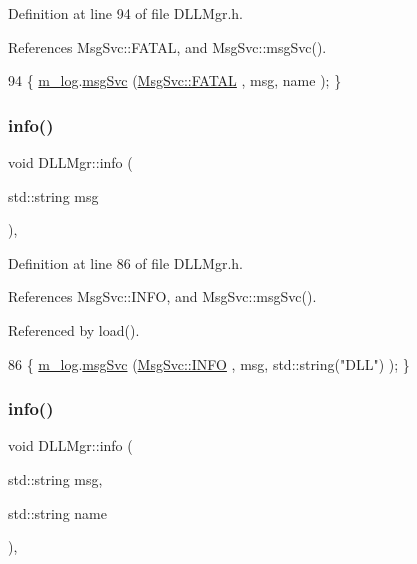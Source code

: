 Definition at line 94 of file D\+L\+L\+Mgr.\+h.



References Msg\+Svc\+::\+F\+A\+T\+AL, and Msg\+Svc\+::msg\+Svc().


\begin{DoxyCode}
94 \{ \hyperlink{classDLLMgr_a64b523faed64378451ee76f6fbf0800d}{m\_log}.\hyperlink{classMsgSvc_ad25f18047920cc59a314e5098259711c}{msgSvc} (\hyperlink{classMsgSvc_ae671eb7301996cd049d2da8a65925926a59c73cb29edfc9cdf35845e2b1301363}{MsgSvc::FATAL}   , msg, name ); \}
\end{DoxyCode}
\mbox{\label{classDLLMgr_a14b8e15b87602027c0a11f91173bebed}} 
\subsubsection{\texorpdfstring{info()}{info()}\hspace{0.1cm}{\footnotesize\ttfamily [1/2]}}
{\footnotesize\ttfamily void D\+L\+L\+Mgr\+::info (\begin{DoxyParamCaption}\item[{std\+::string}]{msg }\end{DoxyParamCaption})\hspace{0.3cm}{\ttfamily [inline]}, {\ttfamily [private]}}



Definition at line 86 of file D\+L\+L\+Mgr.\+h.



References Msg\+Svc\+::\+I\+N\+FO, and Msg\+Svc\+::msg\+Svc().



Referenced by load().


\begin{DoxyCode}
86 \{ \hyperlink{classDLLMgr_a64b523faed64378451ee76f6fbf0800d}{m\_log}.\hyperlink{classMsgSvc_ad25f18047920cc59a314e5098259711c}{msgSvc} (\hyperlink{classMsgSvc_ae671eb7301996cd049d2da8a65925926ad2fcf3f3e734fc41ee097cc23670ce51}{MsgSvc::INFO}    , msg, std::string(\textcolor{stringliteral}{"DLL"}) ); \}
\end{DoxyCode}
\mbox{\label{classDLLMgr_ac6468f1f9079b683ce5fe60e1d697dda}} 
\subsubsection{\texorpdfstring{info()}{info()}\hspace{0.1cm}{\footnotesize\ttfamily [2/2]}}
{\footnotesize\ttfamily void D\+L\+L\+Mgr\+::info (\begin{DoxyParamCaption}\item[{std\+::string}]{msg,  }\item[{std\+::string}]{name }\end{DoxyParamCaption})\hspace{0.3cm}{\ttfamily [inline]}, {\ttfamily [private]}}



